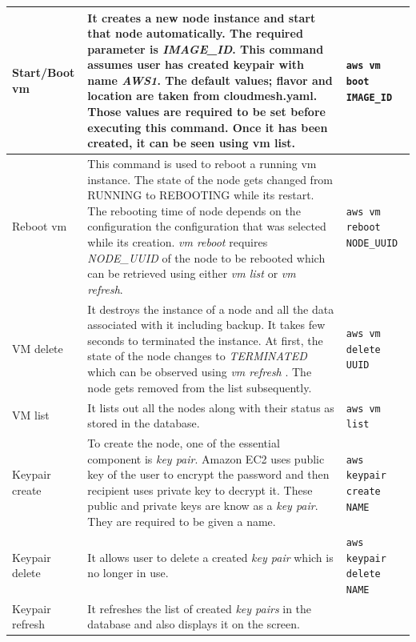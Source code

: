 \documentclass[9pt,twocolumn,twoside]{../../styles/osajnl}
\begin{document}
\begin{table}[htb]
\begin{center}
\begin{tabular}{p{2cm}p{10cm}p{5cm}}
  \hline
  Start/Boot vm & It creates a new node instance and start that
                  node automatically. The required parameter is
                  \textit{IMAGE\_ID}. This command assumes user has created keypair
                  with name \textit{AWS1}. The default values; flavor and location are
                  taken from cloudmesh.yaml. Those values are required to be set
                  before executing this command. Once it has been created, it can be
                  seen using vm list.
                         & \verb+aws vm boot IMAGE_ID+ \\
  \hline
  Reboot vm & This command is used to reboot a running vm
              instance. The state of the node gets changed from RUNNING to
              REBOOTING while its restart. The rebooting time of node depends on
              the configuration the configuration that was selected while its
              creation. \textit{vm reboot} requires \textit{NODE\_UUID} of the
              node to be rebooted which can be retrieved using either \textit{vm
              list} or \textit{vm refresh}.
                         & \verb+aws vm reboot NODE_UUID+ \\
  \hline
  VM delete & It destroys the instance of a node and all the data
              associated with it including backup. It takes few seconds to
              terminated the instance. At first, the state of the node changes
              to \textit{TERMINATED} which can be observed using \textit{vm
              refresh} . The node gets removed from the list subsequently.
                         & \verb+aws vm delete UUID+ \\
  \hline
  VM list  & It lists out all the nodes along with their status as stored in the database.
                         & \verb+aws vm list+ \\
  \hline
  Keypair create & To create the node, one of the essential component is \textit{key pair}. Amazon EC2 uses public key of the user to encrypt the password and then recipient uses private key to decrypt it. These public and private keys are know as a \textit{key pair}. They are required to be given a name.
                         & \verb+aws keypair create NAME+ \\
  \hline
  Keypair delete & It allows user to delete a created \textit{key pair} which is no longer in use.
                         & \verb+aws keypair delete NAME+ \\
  \hline
  Keypair refresh & It refreshes the list of created \textit{key pairs} in the database and also displays it on the screen.

\end{tabular}
\end{center}
\end{table}
\end{document}
